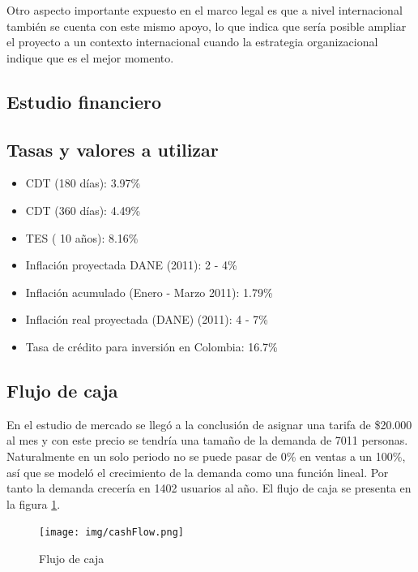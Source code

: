 \documentclass[a4paper, 12pt, oneside]{article}
\begin{document}
	Otro aspecto importante expuesto en el marco legal es que a nivel internacional también se cuenta con este mismo apoyo, lo que indica que sería posible ampliar el proyecto a un contexto internacional cuando la estrategia organizacional indique que es el mejor momento.
	
	\clearpage
	
	\begin{center}
	\section{Estudio financiero}
	\end{center}
	
	\subsection{Tasas y valores a utilizar}
	\begin{itemize}
		\item CDT (180 días): 3.97\%
		\item CDT (360 días): 4.49\%
		\item TES ( 10 años): 8.16\%
		\item Inflación proyectada DANE (2011): 2 - 4\%
		\item Inflación acumulado (Enero - Marzo 2011): 1.79\%
		\item Inflación real proyectada (DANE) (2011): 4 - 7\%
		\item Tasa de crédito para inversión en Colombia: 16.7\%
	\end{itemize}
	
	\subsection{Flujo de caja}
	En el estudio de mercado se llegó a la conclusión de asignar una tarifa de \$20.000 al mes y con este precio se tendría una tamaño de la demanda de 7011 personas. Naturalmente en un solo periodo no se puede pasar de 0\% en ventas a un 100\%, así que se modeló el crecimiento de la demanda como una función lineal. Por tanto la demanda crecería en 1402 usuarios al año. El flujo de caja se presenta en la figura \ref{fig:cashFlow}.
	
	\begin{figure}
	\begin{center}
	\leavevmode
	\texttt{[image: img/cashFlow.png]}
	\end{center}
	\caption{Flujo de caja}
	\label{fig:cashFlow}
	\end{figure}
	
\end{document}
